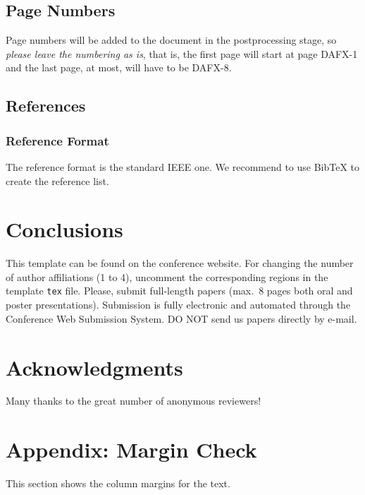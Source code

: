 \documentclass[twoside,a4paper]{article}
\begin{document}
\subsection{Page Numbers}
Page numbers will be added to the document in the postprocessing stage, so {\em please leave the numbering as is},
that is, the first page will start at page DAFX-1 and the last page, at most, will have to be DAFX-8.


\subsection{References}


\subsubsection{Reference Format}
The reference format is the standard IEEE one. We recommend to use BibTeX to create the reference list.


\section{Conclusions}
This template can be found on the conference website.
For changing the number of author affiliations (1 to 4), uncomment the corresponding regions in the template \texttt{tex} file.
Please, submit full-length papers (max.~8 pages both oral and poster presentations).
Submission is fully electronic and automated through the Conference Web Submission System.
DO NOT send us papers directly by e-mail.

\section{Acknowledgments}
Many thanks to the great number of anonymous reviewers!

\nocite{*}




\section{Appendix: Margin Check}
This section shows the column margins for the text. \bigskip\newline
\end{document}
